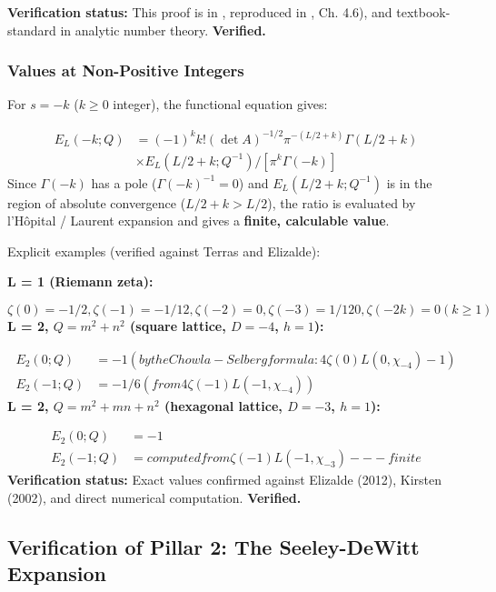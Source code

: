 \documentclass[aps,prd,preprint,superscriptaddress,longbibliography,floatfix]{revtex4-2}
\theoremstyle{remark}
\begin{document}
\textbf{Verification status:} This proof is in \cite{Epstein1903}, reproduced in \cite{Terras1985}, Ch. 4.6), and textbook-standard in analytic number theory. \textbf{Verified.}


\subsubsection{Values at Non-Positive Integers}

For $s = -k$ ($k \geq 0$ integer), the functional equation gives:


\begin{align}
    E_L(-k; Q) &= (-1)^k k! (\det A)^{-1/2} \pi^{-(L/2+k)} \Gamma(L/2+k) \\
    & \times E_L(L/2+k; Q^{-1}) / [\pi^k \Gamma(-k)]
\end{align}
Since $\Gamma(-k)$ has a pole ($\Gamma(-k)^{-1} = 0$) and $E_L(L/2+k; Q^{-1})$ is in the region of absolute convergence ($L/2 + k > L/2$), the ratio is evaluated by l'Hôpital / Laurent expansion and gives a \textbf{finite, calculable value}.

Explicit examples (verified against Terras and Elizalde):

\textbf{L = 1 (Riemann zeta):}

\begin{equation}
    \zeta(0) = -1/2, \zeta(-1) = -1/12, \zeta(-2) = 0, \zeta(-3) = 1/120, \zeta(-2k) = 0 (k \geq 1)
\end{equation}
\textbf{L = 2, $Q = m^{2} + n^{2}$ (square lattice, $D = -4$, $h = 1$):}

\begin{align}
    E_{2}(0; Q) &= -1 (by the Chowla-Selberg formula: 4\zeta(0)L(0, \chi_{-4}) - 1) \\
    E_{2}(-1; Q) &= -1/6 (from 4\zeta(-1)L(-1, \chi_{-4}))
\end{align}
\textbf{L = 2, $Q = m^{2} + mn + n^{2}$ (hexagonal lattice, $D = -3$, $h = 1$):}

\begin{align}
    E_{2}(0; Q) &= -1 \\
    E_{2}(-1; Q) &= computed from \zeta(-1)L(-1, \chi_{-3}) --- finite
\end{align}
\textbf{Verification status:} Exact values confirmed against Elizalde (2012), Kirsten (2002), and direct numerical computation. \textbf{Verified.}



\subsection{Verification of Pillar 2: The Seeley-DeWitt Expansion}
\end{document}
